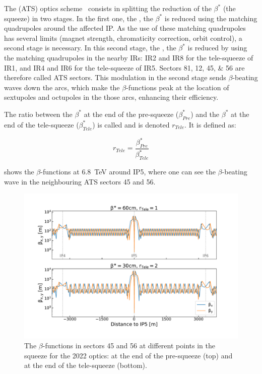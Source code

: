 The  (ATS) optics scheme~\cite{CERN:Fartoukh:ATS_Report,PRAB:Fartoukh:Achromatic_Telescopic_Squeeze,IPAC:Pojer:LHC_ATS_Experience} consists in splitting the reduction of the \(\beta^{\ast}\) (the squeeze) in two stages.
In the first one, the , the \(\beta^{\ast}\) is reduced using the matching quadrupoles around the affected IP.
As the use of these matching quadrupoles has several limits (magnet strength, chromaticity correction, orbit control), a second stage is necessary.
In this second stage, the , the \(\beta^{\ast}\) is reduced by using the matching quadrupoles in the nearby IRs: IR\num{2} and IR\num{8} for the tele-squeeze of IR\num{1}, and IR\num{4} and IR\num{6} for the tele-squeeze of IR\num{5}.
Sectors \numlist{81;12;45;56} are therefore called ATS sectors.
This modulation in the second stage sends \(\beta\)-beating waves down the arcs, which make the \(\beta\)-functions peak at the location of sextupoles and octupoles in the those arcs, enhancing their efficiency.

The ratio between the \(\beta^{\ast}\) at the end of the pre-squeeze (\(\beta^{\ast}_{Pre}\)) and the \(\beta^{\ast}\) at the end of the tele-squeeze (\(\beta^{\ast}_{Tele}\)) is called  and is denoted \(r_{Tele}\).
It is defined as:

\begin{equation}
  r_{Tele} = \frac{\beta^{\ast}_{Pre}}{\beta^{\ast}_{Tele}}
  \label{equation:tele_index}
\end{equation}

 shows the \(\beta\)-functions at \qty{6.8}{\tera\electronvolt} around IP\num{5}, where one can see the \(\beta\)-beating wave in the neighbouring ATS sectors \num{45} and \num{56}.

\begin{figure}[!hbt]
  \centering
  \includegraphics*[width=0.99\linewidth]{Figures/Optics_Measurements_Corrections_at_LHC/lhc_ats_wave.pdf}
  \caption{The \(\beta\)-functions in sectors \num{45} and \num{56} at different points in the squeeze for the \num{2022} optics: at the end of the pre-squeeze (top) and at the end of the tele-squeeze (bottom).}
  \label{figure:lhc_ats_scheme}
\end{figure}

